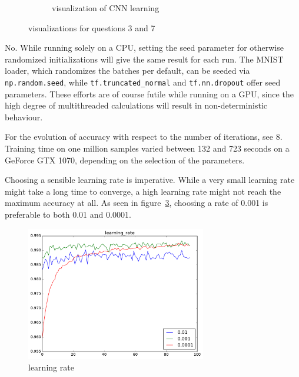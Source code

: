 \documentclass{article}
\def\code#1{\texttt{#1}}
\begin{document}
\begin{enumerate}
\begin{item}
\begin{figure}
\begin{subfigure}[b]{0.45\textwidth}
				\vspace{-24pt}
				\caption{visualization of CNN learning}
				\label{fig:vis_cnn}
			\end{subfigure}	
			\caption{visualizations for questions 3 and 7}
		\end{figure}
	\end{item}
\pagebreak
	\begin{item}
		No. While running solely on a CPU, setting the seed parameter for otherwise randomized initializations will give the same result for each run. The MNIST loader, which randomizes the batches per default, can be seeded via \code{np.random.seed}, while \code{tf.truncated\_normal} and \code{tf.nn.dropout} offer seed parameters. These efforts are of course futile while running on a GPU, since the high degree of multithreaded calculations will result in non-deterministic behaviour. 
	\end{item}
	\begin{item}
	For the evolution of accuracy with respect to the number of iterations, see 8. Training time on one million samples varied between 132 and 723 seconds on a GeForce GTX 1070, depending on the selection of the parameters.
	\end{item}

	\begin{item}
		Choosing a sensible learning rate is imperative. While a very small learning rate might take a long time to converge, a high learning rate might not reach the maximum accuracy at all. As seen in figure~\ref{fig:learning_rate}, choosing a rate of 0.001 is preferable to both 0.01 and 0.0001.
			\begin{figure}
				\centering	
				\includegraphics[width=0.7\textwidth]{figures/learning_rate}
				\caption{learning rate}
				\label{fig:learning_rate}
			\end{figure}


\end{item}
\end{enumerate}
\end{document}
